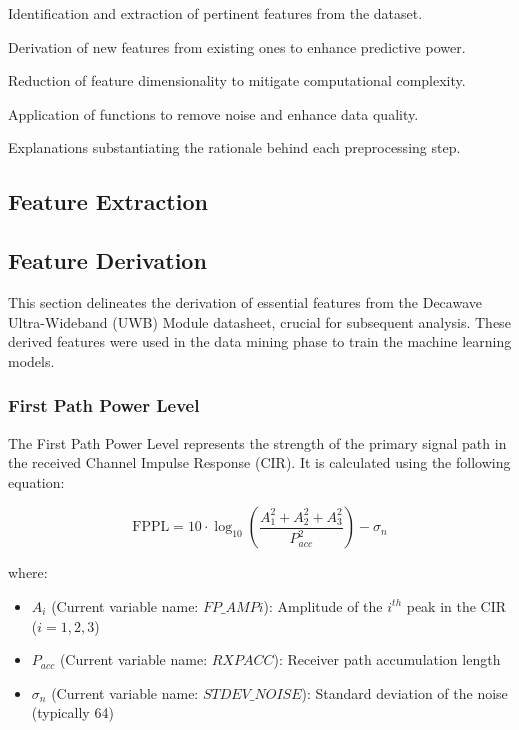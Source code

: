 \documentclass[
	article, %
	11pt, %
	draft, %
]{CSUniSchoolLabReport}
\begin{document}
\begin{description}[style=nextline]
    \item[Feature Extraction:] Identification and extraction of pertinent features from the dataset.
    \item[Feature Derivation:] Derivation of new features from existing ones to enhance predictive power.
    \item[Feature Reduction:] Reduction of feature dimensionality to mitigate computational complexity.
    \item[De-Noise Functions:] Application of functions to remove noise and enhance data quality.
    \item[Justifications of Processes:] Explanations substantiating the rationale behind each preprocessing step.
\end{description}

\subsection{Feature Extraction}\label{feature_extraction}


\subsection{Feature Derivation}\label{feature_derivation}

This section delineates the derivation of essential features from the Decawave Ultra-Wideband (UWB) Module datasheet, crucial for subsequent analysis. These derived features were used in the data mining phase to train the machine learning models.

\subsubsection{First Path Power Level}\label{first_path_power_level}

The First Path Power Level represents the strength of the primary signal path in the received Channel Impulse Response (CIR). It is calculated using the following equation:

\begin{equation}
  \text{FPPL} = 10 \cdot \log_{10} \left( \frac{A_1^2 + A_2^2 + A_3^2}{P_{acc}^2} \right) - \sigma_n
\end{equation}

where:

\begin{itemize}
  \item $A_i$ (Current variable name: $FP\_AMPi$): Amplitude of the $i^{th}$ peak in the CIR ($i = 1, 2, 3$)
  \item $P_{acc}$ (Current variable name: $RXPACC$): Receiver path accumulation length
  \item $\sigma_n$ (Current variable name: $STDEV\_NOISE$): Standard deviation of the noise (typically 64)
\end{itemize}
\end{document}
